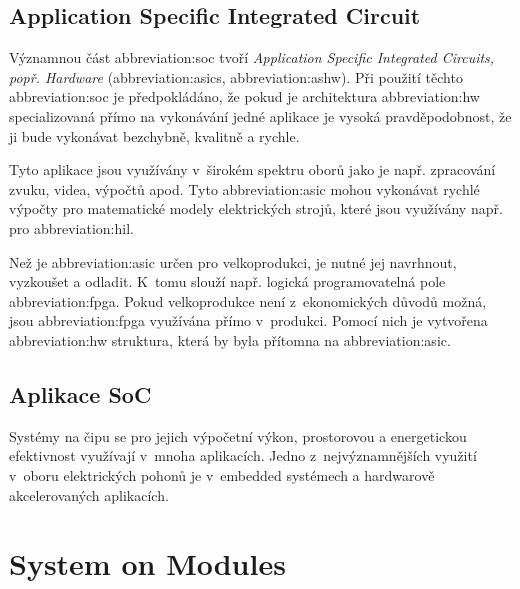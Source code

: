 \documentclass[a4paper, twoside, 11pt]{article}
\begin{document}
	\subsection{Application Specific Integrated Circuit}
		Významnou část \gls{abbreviation:soc} tvoří \textit{Application Specific Integrated Circuits, popř. Hardware} (\gls{abbreviation:asics}, \gls{abbreviation:ashw}). Při použití těchto \gls{abbreviation:soc} je předpokládáno, že pokud je architektura \gls{abbreviation:hw} specializovaná přímo na vykonávání jedné aplikace je vysoká pravděpodobnost, že ji bude vykonávat bezchybně, kvalitně a rychle.\par
		Tyto aplikace jsou využívány v~širokém spektru oborů jako je např. zpracování zvuku, videa, výpočtů apod. Tyto \gls{abbreviation:asic} mohou vykonávat rychlé výpočty pro matematické modely elektrických strojů, které jsou využívány např. pro \gls{abbreviation:hil}.\par
		Než je \gls{abbreviation:asic} určen pro velkoprodukci, je nutné jej navrhnout, vyzkoušet a odladit. K~tomu slouží např. logická programovatelná pole \gls{abbreviation:fpga}. Pokud velkoprodukce není z~ekonomických důvodů možná, jsou \gls{abbreviation:fpga} využívána přímo v~produkci. Pomocí nich je vytvořena \gls{abbreviation:hw} struktura, která by byla přítomna na \gls{abbreviation:asic}.


	\subsection{Aplikace SoC}
	Systémy na čipu se pro jejich výpočetní výkon, prostorovou a energetickou efektivnost využívají v~mnoha aplikacích. Jedno z~nejvýznamnějších využití v~oboru elektrických pohonů je v~embedded systémech a hardwarově akcelerovaných aplikacích.

\section{System on Modules}\label{sec:system-on-modules}
\end{document}
